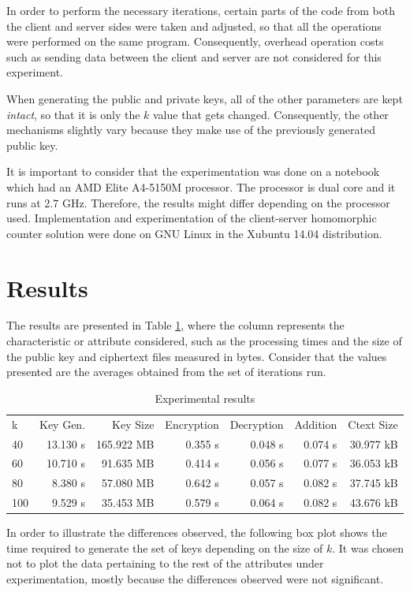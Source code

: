 In order to perform the necessary iterations, certain parts of the code from both the client and server sides were taken and adjusted, so that all the operations were performed on the same program. Consequently, overhead operation costs such as sending data between the client and server are not considered for this experiment.

When generating the public and private keys, all of the other parameters are kept \emph{intact}, so that it is only the $k$ value that gets changed. Consequently, the other mechanisms slightly vary because they make use of the previously generated public key.

It is important to consider that the experimentation was done on a notebook which had an AMD Elite A4-5150M processor. The processor is dual core and it runs at 2.7 GHz. Therefore, the results might differ depending on the processor used. Implementation and experimentation of the client-server homomorphic counter solution were done on GNU Linux in the Xubuntu 14.04 distribution.

\section{Results}

The results are presented in Table \ref{tbl:results}, where the column represents the characteristic or attribute considered, such as the processing times and the size of the public key and ciphertext files measured in bytes. Consider that the values presented are the averages obtained from the set of iterations run.

\begin{table}[t]
  \caption{Experimental results}
  \label{tbl:results}
\begin{tabular}{lrrrrrr}
k   & Key Gen. & Key Size  & Encryption & Decryption & Addition & Ctext Size \\
40  & 13.130 s & 165.922 MB & 0.355 s    & 0.048 s    & 0.074 s  & 30.977 kB        \\
60  & 10.710 s & 91.635 MB  & 0.414 s    & 0.056 s    & 0.077 s  & 36.053 kB        \\
80  & 8.380 s  & 57.080 MB  & 0.642 s    & 0.057 s    & 0.082 s  & 37.745 kB        \\
100 & 9.529 s  & 35.453 MB  & 0.579 s    & 0.064 s    & 0.082 s  & 43.676 kB
\end{tabular}
\end{table}

In order to illustrate the differences observed, the following box plot shows the time required to generate the set of keys depending on the size of $k$. It was chosen not to plot the data pertaining to the rest of the attributes under experimentation, mostly because the differences observed were not significant.

